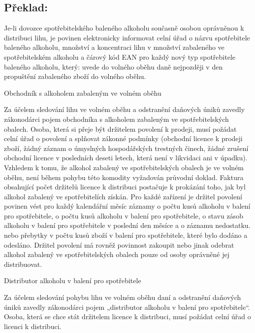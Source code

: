 \documentclass[10pt]{article}
\begin{document}
\pagebreak

\subsection*{Překlad:}

Je-li dovozce spotřebitelského baleného alkoholu současně osobou oprávněnou k distribuci lihu, je povinen elektronicky informovat celní úřad o názvu spotřebitele baleného alkoholu, množství a koncentraci lihu v množství zabaleného ve spotřebitelském alkoholu a čárový kód EAN pro každý nový typ spotřebitele baleného alkoholu, který: uvede do volného oběhu daně nejpozději v den propuštění zabaleného zboží do volného oběhu.


Obchodník s alkoholem zabaleným ve volném oběhu

Za účelem sledování lihu ve volném oběhu a odstranění daňových úniků zavedly zákonodárci pojem obchodníka s alkoholem zabaleným ve spotřebitelských obalech.
Osoba, která si přeje být držitelem povolení k prodeji, musí požádat celní úřad o povolení a splňovat zákonné podmínky (obchodní licence k prodeji zboží, žádný záznam o úmyslných hospodářských trestných činech, žádné zrušení obchodní licence v posledních deseti letech, která není v likvidaci ani v úpadku).
Vzhledem k tomu, že alkohol zabalený ve spotřebitelských obalech je ve volném oběhu, není během pohybu této komodity vyžadován průvodní doklad.
Faktura obsahující počet držitelů licence k distribuci postačuje k prokázání toho, jak byl alkohol zabalený ve spotřebitelích získán.
Pro každé zařízení je držitel povolení povinen vést pro každý kalendářní měsíc záznamy o počtu kusů alkoholu v balení pro spotřebitele, o počtu kusů alkoholu v balení pro spotřebitele, o stavu zásob alkoholu v balení pro spotřebitele v poslední den měsíce a o záznamu nedostatku. nebo přebytky v počtu kusů zboží v balení pro spotřebitele, které bylo dodáno a odesláno.
Držitel povolení má rovněž povinnost zakoupit nebo jinak odebrat alkohol zabalený ve spotřebitelských obalech pouze od osoby oprávněné jej distribuovat.


Distributor alkoholu v balení pro spotřebitele

Za účelem sledování pohybu lihu ve volném oběhu daní a odstranění daňových úniků zavedly zákonodárci pojem „distributor alkoholu v balení pro spotřebitele“.
Osoba, která se chce stát držitelem licence k distribuci, musí požádat celní úřad o licenci k distribuci.
\end{document}
